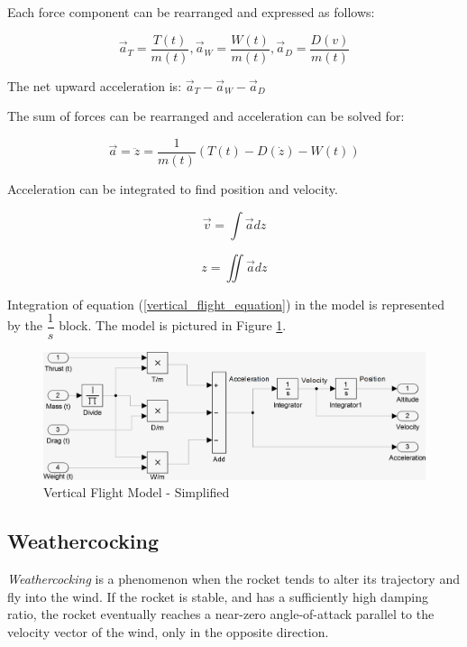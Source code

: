 \documentclass[]{article}
\begin{document}
Each force component can be rearranged and expressed as follows:

\begin{equation}
\vec{a}_T = \dfrac{T(t)}{m(t)}, \vec{a}_W = \dfrac{W(t)}{m(t)}, \vec{a}_D = \dfrac{D(v)}{m(t)}
\end{equation}

The net upward acceleration is: \(\vec{a}_T - \vec{a}_W - \vec{a}_D\)

The sum of forces can be rearranged and acceleration can be solved for:

\begin{equation}
\label{vertical_flight_equation}
\vec{a} =  \ddot{z} = \dfrac{1}{m(t)} (T(t) - D(\dot{z}) - W(t)) 
\end{equation}

Acceleration can be integrated to find position and velocity.

\begin{equation}
\vec{v} = \int \vec{a} dz
\end{equation}

\begin{equation}
z = \iint \vec{a} dz
\end{equation}

Integration of equation (\ref{vertical_flight_equation}) in the model is
represented by the \(\dfrac{1}{s}\) block. The model is pictured in
Figure \ref{vertical_model_simplified}.

\begin{figure}[htbp]
\centering
\includegraphics{images/vertical_model_simplified.png}
\caption{Vertical Flight Model - Simplified
\label{vertical_model_simplified}}
\end{figure}

\subsection{Weathercocking}\label{weathercocking}

\emph{Weathercocking} is a phenomenon when the rocket tends to alter its
trajectory and fly into the wind. If the rocket is stable, and has a
sufficiently high damping ratio, the rocket eventually reaches a
near-zero angle-of-attack parallel to the velocity vector of the wind,
only in the opposite direction.
\end{document}
